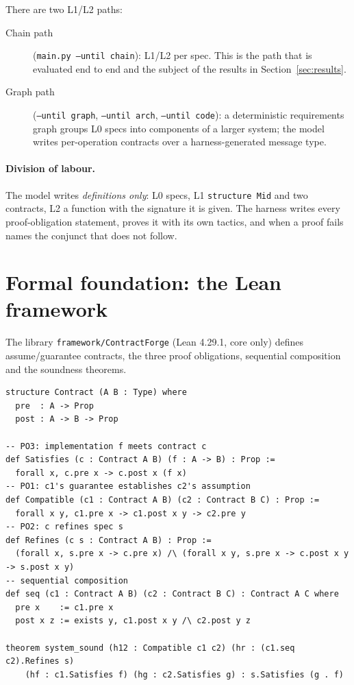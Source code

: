 \documentclass[11pt,a4paper]{article}
\newcommand{\code}[1]{\texttt{#1}}
\newcommand{\file}[1]{\texttt{#1}}
\begin{document}
There are two L1/L2 paths:
\begin{description}
  \item[Chain path] (\code{main.py --until chain}): L1/L2 per spec. This is the path that is
        evaluated end to end and the subject of the results in Section~\ref{sec:results}.
  \item[Graph path] (\code{--until graph}, \code{--until arch}, \code{--until code}): a
        deterministic requirements graph groups L0 specs into components of a larger system;
        the model writes per-operation contracts over a harness-generated message type.
\end{description}

\paragraph{Division of labour.} The model writes \emph{definitions only}: L0 specs, L1
\code{structure Mid} and two contracts, L2 a function with the signature it is given. The
harness writes every proof-obligation statement, proves it with its own tactics, and when a
proof fails names the conjunct that does not follow.

\section{Formal foundation: the Lean framework}

The library \file{framework/ContractForge} (Lean 4.29.1, core only) defines assume/guarantee
contracts, the three proof obligations, sequential composition and the soundness theorems.

\begin{lstlisting}[language=lean]
structure Contract (A B : Type) where
  pre  : A -> Prop
  post : A -> B -> Prop

-- PO3: implementation f meets contract c
def Satisfies (c : Contract A B) (f : A -> B) : Prop :=
  forall x, c.pre x -> c.post x (f x)
-- PO1: c1's guarantee establishes c2's assumption
def Compatible (c1 : Contract A B) (c2 : Contract B C) : Prop :=
  forall x y, c1.pre x -> c1.post x y -> c2.pre y
-- PO2: c refines spec s
def Refines (c s : Contract A B) : Prop :=
  (forall x, s.pre x -> c.pre x) /\ (forall x y, s.pre x -> c.post x y -> s.post x y)
-- sequential composition
def seq (c1 : Contract A B) (c2 : Contract B C) : Contract A C where
  pre x    := c1.pre x
  post x z := exists y, c1.post x y /\ c2.post y z

theorem system_sound (h12 : Compatible c1 c2) (hr : (c1.seq c2).Refines s)
    (hf : c1.Satisfies f) (hg : c2.Satisfies g) : s.Satisfies (g . f)
\end{lstlisting}
\end{document}
